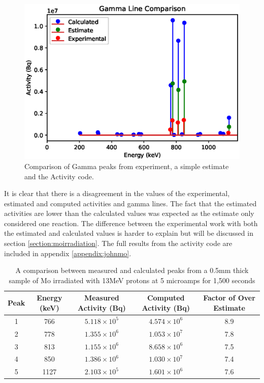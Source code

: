 \begin{figure}[htb]
\centering
\includegraphics[width=0.75\linewidth]{chapters/activity_code/mo-john-hewett/thick/plot_gammas/gammas.eps}
\caption{Comparison of Gamma peaks from experiment, a simple estimate and the Activity code.}
\label{fig:mogammacomparison}
\end{figure}

It is clear that there is a disagreement in the values of the experimental, estimated and computed activities and gamma lines.  The fact that the estimated activities are lower than the calculated values was expected as the estimate only considered one reaction.  The difference between the experimental work with both the estimated and calculated values is harder to explain but will be discussed in section \ref{section:moirradiation}.  The full results from the activity code are included in appendix \ref{appendix:johnmo}.


\begin{table}[h]
\begin{center}
\begin{tabular}{c c c c c}
\hline\hline
Peak & Energy (keV) & Measured Activity (Bq) & Computed Activity (Bq) & Factor of Over Estimate\\
\hline\hline
1 & 766 & $5.118 \times 10^{5}$ & $4.574 \times 10^{6}$ & 8.9\\
2 & 778 & $1.355 \times 10^{6}$ & $1.053 \times 10^{7}$ & 7.8\\
3 & 813 & $1.155 \times 10^{6}$ & $8.658 \times 10^{6}$ & 7.5\\
4 & 850 & $1.386 \times 10^{6}$ & $1.030 \times 10^{7}$ & 7.4 \\
5 & 1127 & $2.103 \times 10^{5}$ & $1.601 \times 10^{6}$ & 7.6 \\
\hline\hline
\end{tabular}
\end{center}
\caption{A comparison between measured and calculated peaks from a 0.5mm thick sample of \Gls{Mo} irradiated with 13MeV protons at 5 microamps for 1,500 seconds}
\label{table:johnhewettresultsvcalculated}
\end{table}






